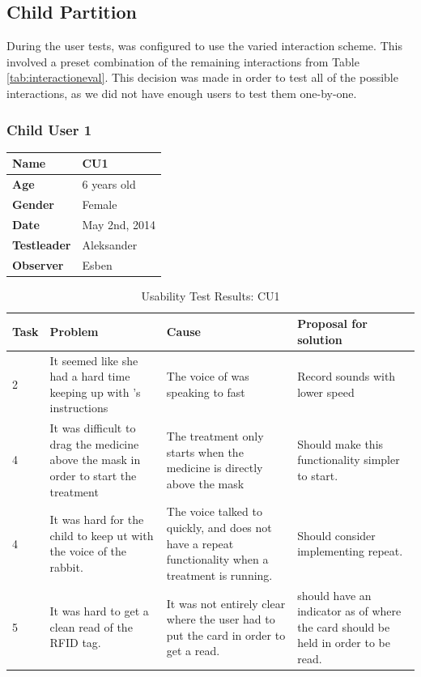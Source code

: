 \subsection{Child Partition}
\label{sec:childresults}

During the user tests, \ab{} was configured to use the varied interaction scheme. This involved a preset combination of the remaining interactions from Table \ref{tab:interactioneval}. This decision was made in order to test all of the possible interactions, as we did not have enough users to test them one-by-one. 

\subsubsection{Child User 1}
\begin{table}[H]
\centering
\begin{tabular}{| p{4.0cm} | p{4.0cm} |}
\hline
 \textbf{Name} & CU1 \\
 \hline
 \textbf{Age} & 6 years old \\
 \hline 
 \textbf{Gender} & Female \\
 \hline 
 \textbf{Date} & May 2nd, 2014 \\
 \hline
 \textbf{Testleader} & Aleksander \\
 \hline
 \textbf{Observer} & Esben \\
 \hline
\end{tabular}
\end{table}

\begin{table}[H]
\centering
\begin{tabular}{| p{1.0cm} | p{4.0cm} | p{4.0cm} | p{4.0cm} |}
\hline
	\textbf{Task} & \textbf{Problem} & \textbf{Cause} & \textbf{Proposal for solution} \\
	\hline
	2 & It seemed like she had a hard time keeping up with \ab{}'s instructions & The voice of \ab{} was speaking to fast & Record sounds with lower speed \\
	\hline
	4 & It was difficult to drag the medicine above the mask in order to start the treatment & The treatment only starts when the medicine is directly above the mask & Should make this functionality simpler to start.  \\
	\hline
	4 & It was hard for the child to keep ut with the voice of the rabbit. & The voice talked to quickly, and \app{} does not have a repeat functionality when a treatment is running. & Should consider implementing repeat.\\ 
	\hline
	5 & It was hard to get a clean read of the RFID tag. & It was not entirely clear where the user had to put the card in order to get a read. & \ab{} should have an indicator as of where the card should be held in order to be read.  \\
	\hline
\end{tabular}
\caption{Usability Test Results: CU1}
\label{tab:testchild1}
\end{table}

